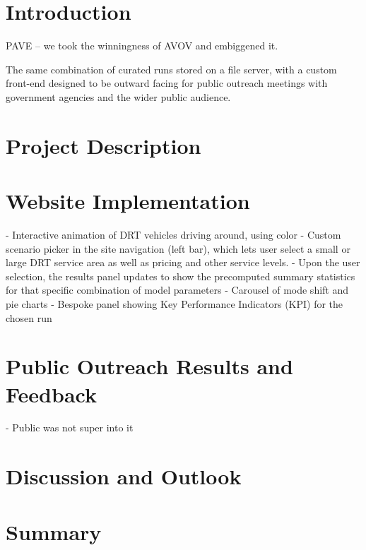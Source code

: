 \section{Introduction}
\label{pave-intro}

PAVE -- we took the winningness of AVOV and embiggened it.

The same combination of curated runs stored on a file server, with a custom front-end designed to be outward facing for public outreach meetings with government agencies and the wider public audience.

\section{Project Description}
\label{pave-project-description}

\section{Website Implementation}
\label{pave-site-features}

- Interactive animation of DRT vehicles driving around, using color
- Custom scenario picker in the site navigation (left bar), which lets user select a small or large DRT service area as well as pricing and other service levels.
- Upon the user selection, the results panel updates to show the precomputed summary statistics for that specific combination of model parameters
- Carousel of mode shift and pie charts
- Bespoke panel showing Key Performance Indicators (KPI) for the chosen run

\section{Public Outreach Results and Feedback}
\label{pave-feedback}

- Public was not super into it


\section{Discussion and Outlook}
\label{pave-discussion}

\section{Summary}
\label{pave-summary}

